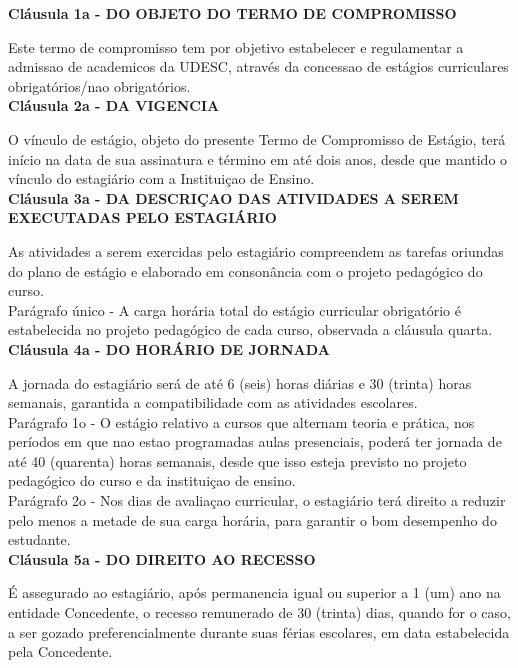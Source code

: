 \documentclass[10pt,a4paper]{article}
\begin{document}
\textbf{Cláusula 1a - DO OBJETO DO TERMO DE COMPROMISSO}

Este termo de compromisso tem por objetivo estabelecer e regulamentar a 
admissao de academicos da UDESC, através da concessao de estágios 
curriculares obrigatórios/nao obrigatórios.
\\

\textbf{Cláusula 2a - DA VIGENCIA}

O vínculo de estágio, objeto do presente Termo de Compromisso de 
Estágio, terá início na data de sua assinatura e término em até dois 
anos, desde que mantido o vínculo do estagiário com a Instituiçao de 
Ensino. 
\\

\textbf{Cláusula 3a - DA DESCRIÇAO DAS ATIVIDADES A SEREM EXECUTADAS 
PELO ESTAGIÁRIO}

As atividades a serem exercidas pelo estagiário compreendem as tarefas 
oriundas do plano de estágio e elaborado em consonância com o projeto 
pedagógico do curso. 
\\

Parágrafo único - A carga horária total do estágio curricular 
obrigatório é estabelecida no projeto pedagógico de cada curso, 
observada a cláusula quarta.
\\

\textbf{Cláusula 4a - DO HORÁRIO DE JORNADA}

A jornada do estagiário será de até 6 (seis) horas diárias e 30 (trinta) 
horas semanais, garantida a compatibilidade com as atividades escolares.
\\

Parágrafo 1o - O estágio relativo a cursos que alternam teoria e 
prática, nos períodos em que nao estao programadas aulas presenciais, 
poderá ter jornada de até 40 (quarenta) horas semanais, desde que isso 
esteja previsto no projeto pedagógico do curso e da instituiçao de 
ensino.
\\

Parágrafo 2o - Nos dias de avaliaçao curricular, o estagiário terá 
direito a reduzir pelo menos a metade de sua carga horária, para 
garantir o bom desempenho do estudante.
\\

\textbf{Cláusula 5a - DO DIREITO AO RECESSO}

É assegurado ao estagiário, após permanencia igual ou superior a 1 (um) 
ano na entidade Concedente, o recesso remunerado de 30 (trinta) dias, 
quando for o caso, a ser gozado preferencialmente durante suas férias 
escolares, em data estabelecida pela Concedente.
\\
\end{document}
